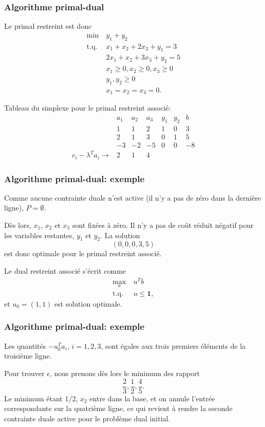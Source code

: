 \documentclass[t,usepdftitle=false]{beamer}
\def\bone{\boldsymbol{1}}
\begin{document}
\begin{frame}
\frametitle{Algorithme primal-dual}

Le primal restreint est donc
\begin{align*}
\min\ & y_1 + y_2 \\
\mbox{t.q. } & x_1 + x_2 + 2x_3 + y_1 = 3 \\
& 2x_1 + x_2 + 3x_3 + y_2 = 5 \\
& x_1 \geq 0, x_2 \geq 0, x_3 \geq 0 \\
& y_1, y_2 \geq 0 \\
& x_1 = x_2 = x_3 = 0.
\end{align*}

Tableau du simplexe pour le primal restreint associé:
\[
\begin{matrix}
& a_1 & a_2 & a_3 & y_1 & y_2 & b \\
& 1 & 1 & 2 & 1 & 0 & 3 \\
& 2 & 1 & 3 & 0 & 1 & 5 \\
& -3 & -2 & -5 & 0 & 0 & -8 \\
c_i - \lambda^Ta_i \rightarrow & 2 & 1 & 4
\end{matrix}
\]

\end{frame}

\begin{frame}
\frametitle{Algorithme primal-dual: exemple}

Comme aucune contrainte duale n'est active (il n'y a pas de zéro dans la dernière ligne), $P = \emptyset$.

\mbox{}

Dès lors, $x_1$, $x_2$ et $x_3$ sont fixées à zéro. Il n'y a pas de coût réduit négatif pour les variables restantes, $y_1$ et $y_2$. La solution
\[
(0, 0, 0, 3, 5)
\]
est donc optimale pour le primal restreint associé.

\mbox{}

Le dual restreint associé s'écrit comme
\begin{align*}
\max_u\ & u^T b\\
\mbox{t.q. } & u \leq \bone,
\end{align*}
et $u_0 = (1,1)$ est solution optimale.

\end{frame}

\begin{frame}
\frametitle{Algorithme primal-dual: exemple}

Les quantités $-u_0^Ta_i$, $i = 1, 2, 3$, sont égales aux trois premiers éléments de la troisième ligne.

\mbox{}

Pour trouver $\epsilon$, nous prenons dès lors le minimum des rapport
\[
\frac{2}{3}, \frac{1}{2}, \frac{4}{5}.
\]
Le minimum étant $1/2$, $x_2$ entre dans la base, et on annule l'entrée correspondante sur la quatrième ligne, ce qui revient à rendre la seconde contrainte duale active pour le problème dual initial.

\end{frame}
\end{document}
